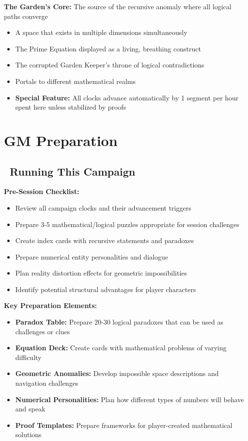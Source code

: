 \documentclass[11pt]{article}
\begin{document}
\textbf{The Garden's Core:}
The source of the recursive anomaly where all logical paths converge
\begin{itemize}
    \item A space that exists in multiple dimensions simultaneously
    \item The Prime Equation displayed as a living, breathing construct
    \item The corrupted Garden Keeper's throne of logical contradictions
    \item Portals to different mathematical realms
    \item \textbf{Special Feature:} All clocks advance automatically by 1 segment per hour spent here unless stabilized by proofs
\end{itemize}

\section{GM Preparation}

\subsection*{\faDice\ Running This Campaign}

\textbf{Pre-Session Checklist:}
\begin{itemize}
    \item Review all campaign clocks and their advancement triggers
    \item Prepare 3-5 mathematical/logical puzzles appropriate for session challenges
    \item Create index cards with recursive statements and paradoxes
    \item Prepare numerical entity personalities and dialogue
    \item Plan reality distortion effects for geometric impossibilities
    \item Identify potential structural advantages for player characters
\end{itemize}

\textbf{Key Preparation Elements:}
\begin{itemize}
    \item \textbf{Paradox Table:} Prepare 20-30 logical paradoxes that can be used as challenges or clues
    \item \textbf{Equation Deck:} Create cards with mathematical problems of varying difficulty
    \item \textbf{Geometric Anomalies:} Develop impossible space descriptions and navigation challenges
    \item \textbf{Numerical Personalities:} Plan how different types of numbers will behave and speak
    \item \textbf{Proof Templates:} Prepare frameworks for player-created mathematical solutions
\end{itemize}
\end{document}
